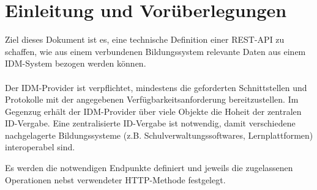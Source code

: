 \chapter{Einleitung und Vorüberlegungen}
Ziel dieses Dokument ist es, eine technische Definition einer REST-API zu schaffen, wie aus einem verbundenen Bildungssystem relevante Daten aus einem IDM-System bezogen werden können.\\
\\
Der IDM-Provider ist verpflichtet, mindestens die geforderten Schnittstellen und Protokolle mit der angegebenen Verfügbarkeitsanforderung bereitzustellen.
Im Gegenzug erhält der IDM-Provider über viele Objekte die Hoheit der zentralen ID-Vergabe.
Eine zentralisierte ID-Vergabe ist notwendig, damit verschiedene nachgelagerte Bildungssysteme (z.B. Schulverwaltungssoftwares, Lernplattformen) interoperabel sind.

Es werden die notwendigen Endpunkte definiert und jeweils die zugelassenen Operationen nebst verwendeter HTTP-Methode festgelegt.

